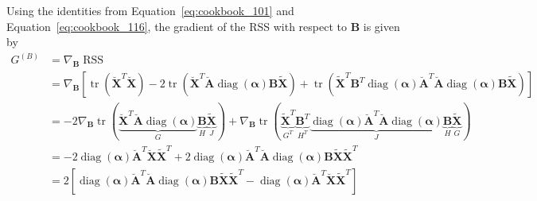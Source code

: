 \documentclass[oneside]{article}
\begin{document}
Using the identities from Equation~\ref{eq:cookbook_101} and Equation~\ref{eq:cookbook_116}, the gradient of the RSS with respect to $\mathbf{B}$ is given by
\begin{equation}
    \label{eq:relaxed_weighted_objective_grad_B}
    \begin{aligned}
        G^{(B)} &= \nabla_{\mathbf{B}} \operatorname{RSS} \\
        &= \nabla_{\mathbf{B}}
        \left[
            \operatorname{tr}\left( \breve{\mathbf{X}}^T \breve{\mathbf{X}} \right)
            - 2 \operatorname{tr} \left( \breve{\mathbf{X}}^T \breve{\mathbf{A}} \operatorname{diag}(\boldsymbol{\alpha}) \mathbf{B} \tilde{\mathbf{X}} \right)
            + \operatorname{tr} \left( \tilde{\mathbf{X}}^T \mathbf{B}^T \operatorname{diag}(\boldsymbol{\alpha}) \breve{\mathbf{A}}^T \breve{\mathbf{A}} \operatorname{diag}(\boldsymbol{\alpha}) \mathbf{B} \tilde{\mathbf{X}} \right)
        \right] \\
        &=
            - 2 \nabla_{\mathbf{B}} \operatorname{tr}(\underbrace{\breve{\mathbf{X}}^T \breve{\mathbf{A}} \operatorname{diag}(\boldsymbol{\alpha})}_{G} \underbrace{\mathbf{B}}_{H} \underbrace{\tilde{\mathbf{X}}}_{J})
            + \nabla_{\mathbf{B}} \operatorname{tr}(\underbrace{\tilde{\mathbf{X}}^T}_{G^T} \underbrace{\mathbf{B}^T}_{H^T} \underbrace{\operatorname{diag}(\boldsymbol{\alpha}) \breve{\mathbf{A}}^T \breve{\mathbf{A}} \operatorname{diag}(\boldsymbol{\alpha})}_{J} \underbrace{\mathbf{B}}_{H} \underbrace{\tilde{\mathbf{X}}}_{G}) \\
        & =
            -2 \operatorname{diag}(\boldsymbol{\alpha}) \breve{\mathbf{A}}^T \breve{\mathbf{X}} \tilde{\mathbf{X}}^T
            +2 \operatorname{diag}(\boldsymbol{\alpha}) \breve{\mathbf{A}}^T \breve{\mathbf{A}} \operatorname{diag}(\boldsymbol{\alpha}) \mathbf{B} \tilde{\mathbf{X}} \tilde{\mathbf{X}}^T \\
        & = 2
        \left[
            \operatorname{diag}(\boldsymbol{\alpha}) \breve{\mathbf{A}}^T \breve{\mathbf{A}} \operatorname{diag}(\boldsymbol{\alpha}) \mathbf{B} \tilde{\mathbf{X}} \tilde{\mathbf{X}}^T
            - \operatorname{diag}(\boldsymbol{\alpha}) \breve{\mathbf{A}}^T \breve{\mathbf{X}} \tilde{\mathbf{X}}^T
        \right]
    \end{aligned}
\end{equation}
\end{document}

